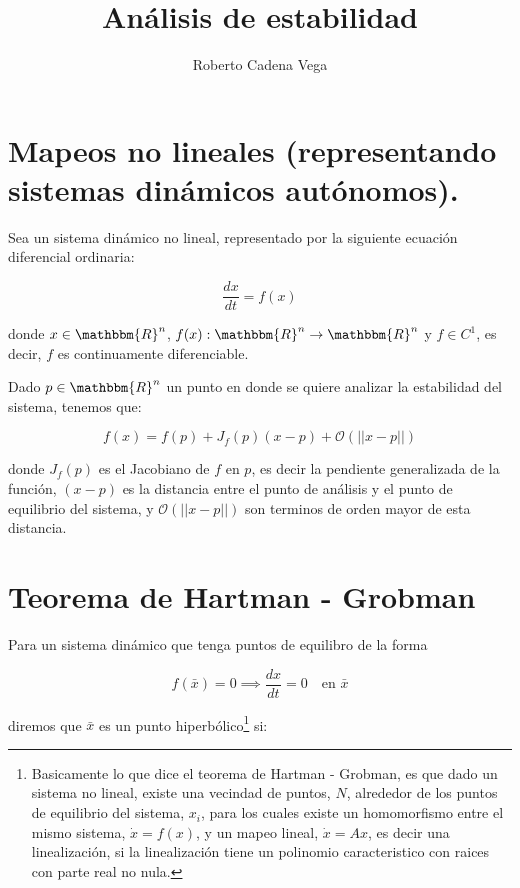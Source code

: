 

\title{Análisis de estabilidad}
\author{Roberto Cadena Vega}


    \maketitle

    \section{Mapeos no lineales (representando sistemas dinámicos autónomos).}

        Sea un sistema dinámico no lineal, representado por la siguiente ecuación diferencial ordinaria:

        \begin{equation}
            \frac{dx}{dt} = f(x)
        \end{equation}

        donde $x \in \mathbbm{R}^n$, $f(x) : \mathbbm{R}^n \to \mathbbm{R}^n$ y $f \in C^1$, es decir, $f$ es continuamente diferenciable.

        Dado $p \in \mathbbm{R}^n$ un punto en donde se quiere analizar la estabilidad del sistema, tenemos que:

        \begin{equation}
            f(x) = f(p) + J_f(p)(x-p) + \mathcal{O}(||x-p||)
        \end{equation}

        donde $J_f(p)$ es el Jacobiano de $f$ en $p$, es decir la pendiente generalizada de la función, $(x-p)$ es la distancia entre el punto de análisis y el punto de equilibrio del sistema, y $\mathcal{O}(||x-p||)$ son terminos de orden mayor de esta distancia.

    \section{Teorema de Hartman - Grobman}

        Para un sistema dinámico que tenga puntos de equilibro de la forma

        \begin{equation}
            f(\bar{x}) = 0 \implies \frac{dx}{dt} = 0 \quad \text{en } \bar{x}
        \end{equation}

        diremos que $\bar{x}$ es un punto hiperbólico\footnote{Basicamente lo que dice el teorema de Hartman - Grobman, es que dado un sistema no lineal, existe una vecindad de puntos, $N$, alrededor de los puntos de equilibrio del sistema, $x_i$, para los cuales existe un homomorfismo entre el mismo sistema, $\dot{x} = f(x)$, y un mapeo lineal, $\dot{x} = Ax$, es decir una linealización, si la linealización tiene un polinomio caracteristico con raices con parte real no nula.} si:


